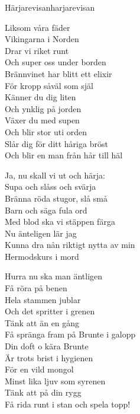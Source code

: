\begin{song}{Härjarevisan}{harjarevisan}
\begin{vers}
Liksom våra fäder\\
Vikingarna i Norden\\
Drar vi riket runt\\
Och super oss under borden\\
Brännvinet har blitt ett elixir\\
För kropp såväl som själ\\
Känner du dig liten\\
Och ynklig på jorden\\
Växer du med supen\\
Och blir stor uti orden\\
Slår dig för ditt håriga bröst\\
Och blir en man från hår till häl\\
\end{vers}
\begin{vers}
Ja, nu skall vi ut och härja:\\
Supa och slåss och svärja\\
Bränna röda stugor, slå små\\
Barn och säga fula ord\\
Med blod ska vi stäppen färga\\
Nu änteligen lär jag\\
Kunna dra nån riktigt nytta av min\\
Hermodskurs i mord\\
\end{vers}
\newp
\begin{vers}
Hurra nu ska man äntligen\\
Få röra på benen\\
Hela stammen jublar\\
Och det spritter i grenen\\
Tänk att än en gång\\
Få spränga fram på Brunte i galopp\\
Din doft o kära Brunte\\
Är trots brist i hygienen\\
För en vild mongol\\
Minst lika ljuv som syrenen\\
Tänk att på din rygg\\
Få rida runt i stan och spela topp!\\
\end{vers}

\end{song}
